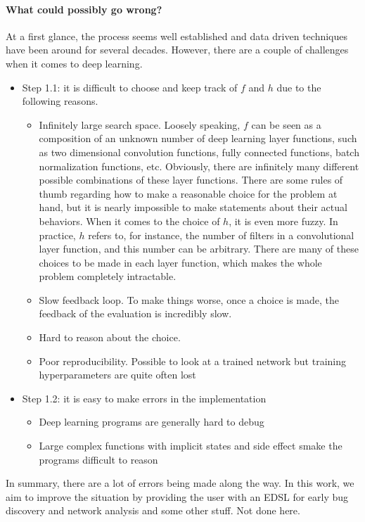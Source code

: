 \paragraph{What could possibly go wrong?}
At a first glance, the process seems well established and data driven techniques have been around for several decades. However, there are a couple of challenges when it comes to deep learning.
\begin{itemize}
\item Step 1.1: it is difficult to choose and keep track of $f$ and $h$ due to the following reasons.
\begin{itemize}
\item Infinitely large search space. Loosely speaking, $f$ can be seen as a composition of an unknown number of deep learning layer functions, such as two dimensional convolution functions, fully connected functions, batch normalization functions, etc. Obviously, there are infinitely many different possible combinations of these layer functions. There are some rules of thumb regarding how to make a reasonable choice for the problem at hand, but it is nearly impossible to make statements about their actual behaviors. When it comes to the choice of $h$, it is even more fuzzy. In practice, $h$ refers to, for instance, the number of filters in a convolutional layer function, and this number can be arbitrary. There are many of these choices to be made in each layer function, which makes the whole problem completely intractable.
\item Slow feedback loop. To make things worse, once a choice is made, the feedback of the evaluation is incredibly slow.
\item Hard to reason about the choice.
\item Poor reproducibility. Possible to look at a trained network but training hyperparameters are quite often lost
\end{itemize}
\item Step 1.2: it is easy to make errors in the implementation
\begin{itemize}
\item Deep learning programs are generally hard to debug
\item Large complex functions with implicit states and side effect smake the programs difficult to reason
\end{itemize}
\end{itemize}
In summary, there are a lot of errors being made along the way. In this work, we aim to improve the situation by providing the user with an EDSL for early bug discovery and network analysis and some other stuff. Not done here.

